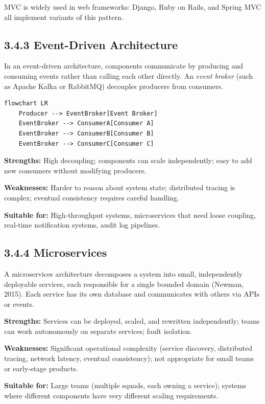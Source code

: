 \documentclass[11pt,a4paper]{book}
\begin{document}
MVC is widely used in web frameworks: Django, Ruby on Rails, and Spring MVC all implement variants of this pattern.

\subsection{3.4.3 Event-Driven Architecture}

In an event-driven architecture, components communicate by producing and consuming events rather than calling each other directly. An \textit{event broker} (such as Apache Kafka or RabbitMQ) decouples producers from consumers.

\begin{lstlisting}
flowchart LR
    Producer --> EventBroker[Event Broker]
    EventBroker --> ConsumerA[Consumer A]
    EventBroker --> ConsumerB[Consumer B]
    EventBroker --> ConsumerC[Consumer C]
\end{lstlisting}

\textbf{Strengths:} High decoupling; components can scale independently; easy to add new consumers without modifying producers.

\textbf{Weaknesses:} Harder to reason about system state; distributed tracing is complex; eventual consistency requires careful handling.

\textbf{Suitable for:} High-throughput systems, microservices that need loose coupling, real-time notification systems, audit log pipelines.

\subsection{3.4.4 Microservices}

A microservices architecture decomposes a system into small, independently deployable services, each responsible for a single bounded domain (Newman, 2015). Each service has its own database and communicates with others via APIs or events.

\textbf{Strengths:} Services can be deployed, scaled, and rewritten independently; teams can work autonomously on separate services; fault isolation.

\textbf{Weaknesses:} Significant operational complexity (service discovery, distributed tracing, network latency, eventual consistency); not appropriate for small teams or early-stage products.

\textbf{Suitable for:} Large teams (multiple squads, each owning a service); systems where different components have very different scaling requirements.
\end{document}
